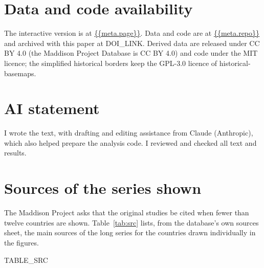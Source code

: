 \documentclass[11pt,a4paper]{article}
\begin{document}
\section*{Data and code availability}
The interactive version is at \url{{{meta.page}}}. Data and code are at \url{{{meta.repo}}} and archived with this paper at {{DOI_LINK}}. Derived data are released under CC BY 4.0 (the Maddison Project Database is CC BY 4.0) and code under the MIT licence; the simplified historical borders keep the GPL-3.0 licence of historical-basemaps.

\section*{AI statement}
I wrote the text, with drafting and editing assistance from Claude (Anthropic), which also helped prepare the analysis code. I reviewed and checked all text and results.

\appendix
\section{Sources of the series shown}
The Maddison Project asks that the original studies be cited when fewer than twelve countries are shown. Table~\ref{tab:src} lists, from the database's own sources sheet, the main sources of the long series for the countries drawn individually in the figures.

{{TABLE_SRC}}
\end{document}
